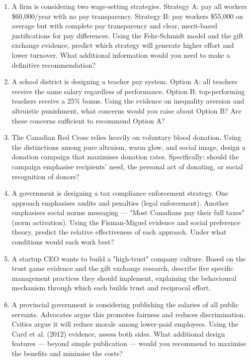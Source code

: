 \documentclass[12pt, letterpaper]{article}
\begin{document}
\begin{enumerate}
\item A firm is considering two wage-setting strategies. Strategy A: pay all workers \$60,000/year with no pay transparency. Strategy B: pay workers \$55,000 on average but with complete pay transparency and clear, merit-based justifications for pay differences. Using the Fehr-Schmidt model and the gift exchange evidence, predict which strategy will generate higher effort and lower turnover. What additional information would you need to make a definitive recommendation?

\item A school district is designing a teacher pay system. Option A: all teachers receive the same salary regardless of performance. Option B: top-performing teachers receive a 25\% bonus. Using the evidence on inequality aversion and altruistic punishment, what concerns would you raise about Option B? Are these concerns sufficient to recommend Option A?

\item The Canadian Red Cross relies heavily on voluntary blood donation. Using the distinctions among pure altruism, warm glow, and social image, design a donation campaign that maximises donation rates. Specifically: should the campaign emphasise recipients' need, the personal act of donating, or social recognition of donors?
\newpage
\item A government is designing a tax compliance enforcement strategy. One approach emphasises audits and penalties (legal enforcement). Another emphasises social norms messaging --- "Most Canadians pay their full taxes" (norm activation). Using the Fisman-Miguel evidence and social preference theory, predict the relative effectiveness of each approach. Under what conditions would each work best?

\item A startup CEO wants to build a "high-trust" company culture. Based on the trust game evidence and the gift exchange research, describe five specific management practices they should implement, explaining the behavioural mechanism through which each builds trust and reciprocal effort.

\item A provincial government is considering publishing the salaries of all public servants. Advocates argue this promotes fairness and reduces discrimination. Critics argue it will reduce morale among lower-paid employees. Using the Card et al. (2012) evidence, assess both sides. What additional design features --- beyond simple publication --- would you recommend to maximise the benefits and minimise the costs?


\end{enumerate}
\end{document}
